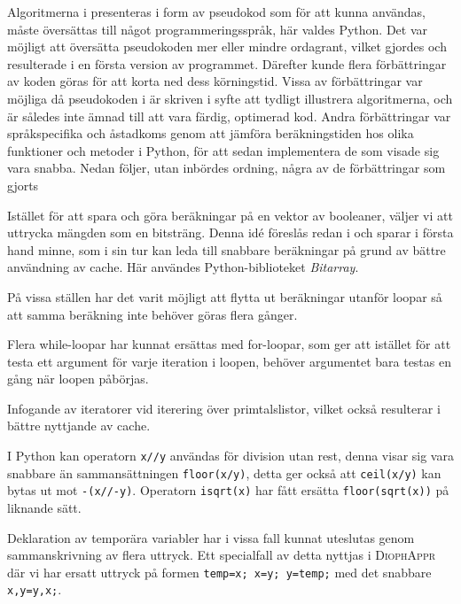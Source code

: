 
Algoritmerna i \cite{HaraldSieve} presenteras i form av pseudokod som för att kunna användas, måste översättas till något programmeringsspråk, här valdes Python.
Det var möjligt att översätta pseudokoden mer eller mindre ordagrant, vilket gjordes och resulterade i en första version av programmet.
Därefter kunde flera förbättringar av koden göras för att korta ned dess körningstid. 
Vissa av förbättringar var möjliga då pseudokoden i \cite{HaraldSieve} är skriven i syfte att tydligt illustrera algoritmerna,
och är således inte ämnad till att vara färdig, optimerad kod.
Andra förbättringar var språkspecifika och åstadkoms genom att jämföra beräkningstiden hos olika funktioner och metoder i Python, för att sedan implementera de som visade sig vara snabba. Nedan följer, utan inbördes ordning, några av de förbättringar som gjorts
\begin{myitemize}
    \item Istället för att spara och göra beräkningar på en vektor av booleaner, väljer vi att uttrycka mängden som en bitsträng. 
    Denna idé föreslås redan i \cite{HaraldSieve} och sparar i första hand minne,
    som i sin tur kan leda till snabbare beräkningar på grund av bättre användning av cache.
    Här användes Python-biblioteket \textit{Bitarray}.
    \item På vissa ställen har det varit möjligt att flytta ut beräkningar utanför loopar så att samma beräkning inte behöver göras flera gånger.
    \item Flera while-loopar har kunnat ersättas med for-loopar,
    som ger att istället för att testa ett argument för varje iteration i loopen,
    behöver argumentet bara testas en gång när loopen påbörjas.
    \item Infogande av iteratorer vid iterering över primtalslistor, vilket också resulterar i bättre nyttjande av cache.
    \item I Python kan operatorn \texttt{x//y} användas för division utan rest, denna visar sig vara snabbare än sammansättningen \texttt{floor(x/y)},
    detta ger också att \texttt{ceil(x/y)} kan bytas ut mot \texttt{-(x//-y)}. Operatorn \texttt{isqrt(x)} har fått ersätta \texttt{floor(sqrt(x))} på liknande sätt.
    \item Deklaration av temporära variabler har i vissa fall kunnat uteslutas genom sammanskrivning av flera uttryck. 
    Ett specialfall av detta nyttjas i \textsc{DiophAppr} där vi har ersatt uttryck på formen \texttt{temp=x; x=y; y=temp;} med det snabbare \texttt{x,y=y,x;}.
\end{myitemize}
